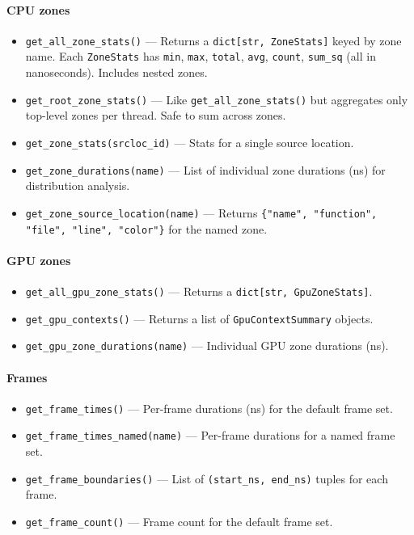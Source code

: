 \documentclass[hidelinks,titlepage,a4paper,twoside]{article}
\begin{document}
\paragraph{CPU zones}
\begin{itemize}
\item \texttt{get\_all\_zone\_stats()} --- Returns a \texttt{dict[str, ZoneStats]} keyed by zone name. Each \texttt{ZoneStats} has \texttt{min}, \texttt{max}, \texttt{total}, \texttt{avg}, \texttt{count}, \texttt{sum\_sq} (all in nanoseconds). Includes nested zones.
\item \texttt{get\_root\_zone\_stats()} --- Like \texttt{get\_all\_zone\_stats()} but aggregates only top-level zones per thread. Safe to sum across zones.
\item \texttt{get\_zone\_stats(srcloc\_id)} --- Stats for a single source location.
\item \texttt{get\_zone\_durations(name)} --- List of individual zone durations (ns) for distribution analysis.
\item \texttt{get\_zone\_source\_location(name)} --- Returns \texttt{\{"name", "function", "file", "line", "color"\}} for the named zone.
\end{itemize}

\paragraph{GPU zones}
\begin{itemize}
\item \texttt{get\_all\_gpu\_zone\_stats()} --- Returns a \texttt{dict[str, GpuZoneStats]}.
\item \texttt{get\_gpu\_contexts()} --- Returns a list of \texttt{GpuContextSummary} objects.
\item \texttt{get\_gpu\_zone\_durations(name)} --- Individual GPU zone durations (ns).
\end{itemize}

\paragraph{Frames}
\begin{itemize}
\item \texttt{get\_frame\_times()} --- Per-frame durations (ns) for the default frame set.
\item \texttt{get\_frame\_times\_named(name)} --- Per-frame durations for a named frame set.
\item \texttt{get\_frame\_boundaries()} --- List of \texttt{(start\_ns, end\_ns)} tuples for each frame.
\item \texttt{get\_frame\_count()} --- Frame count for the default frame set.
\end{itemize}
\end{document}
